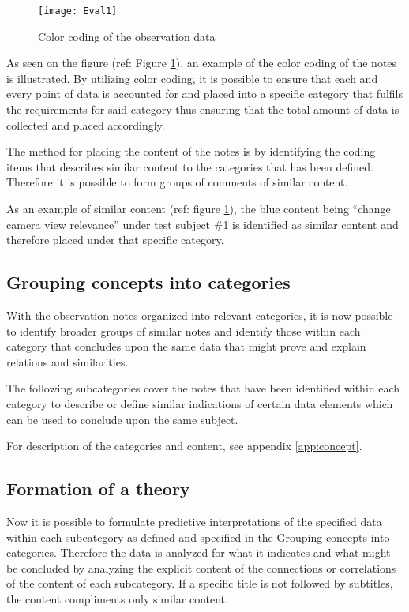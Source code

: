 \begin{figure}[!htbp]
\centering
\texttt{[image: Eval1]}
\caption{Color coding of the observation data} \label{fig:colorcoding}
\end{figure}

As seen on the figure (ref: Figure \ref{fig:colorcoding}), an example of the color coding of the notes is illustrated. 
By utilizing color coding, it is possible to ensure that each and every point of data is accounted for and placed into a specific category that fulfils the requirements for said category thus ensuring that the total amount of data is collected and placed accordingly.
\bigskip

The method for placing the content of the notes is by identifying the coding items that describes similar content to the categories that has been defined. 
Therefore it is possible to form groups of comments of similar content.
\bigskip

As an example of similar content (ref: figure \ref{fig:colorcoding}), the blue content being “change camera view relevance” under test subject \#1 is identified as similar content and therefore placed under that specific category.


\subsection*{Grouping concepts into categories}
 With the observation notes organized into relevant categories, it is now possible to identify broader groups of similar notes and identify those within each category that concludes upon the same data that might prove and explain relations and similarities.
 

The following subcategories cover the notes that have been identified within each category to describe or define similar indications of certain data elements which can be used to conclude upon the same subject.
\bigskip

For description of the categories and content, see appendix \ref{app:concept}.


\subsection*{Formation of a theory}
Now it is possible to formulate predictive interpretations of the specified data within each subcategory as defined and specified in the Grouping concepts into categories. 
Therefore the data is analyzed for what it indicates and what might be concluded by analyzing the explicit content of the connections or correlations of the content of each subcategory. If a specific title is not followed by subtitles, the content compliments only similar content.
\bigskip

